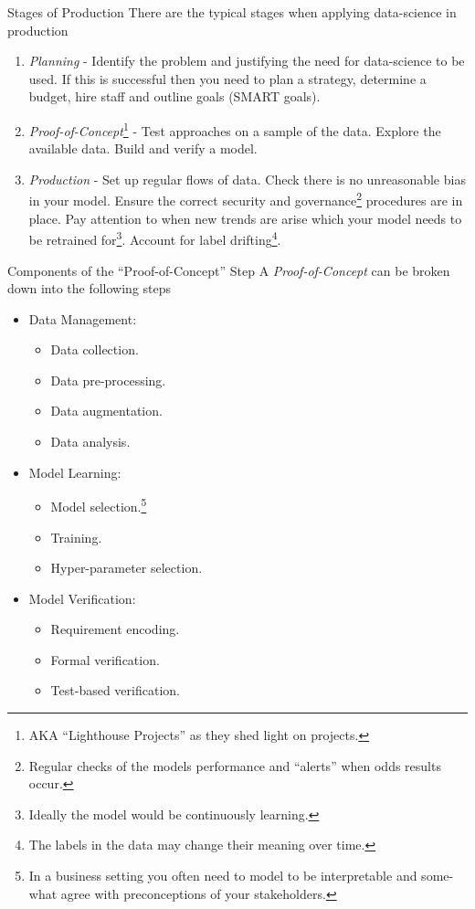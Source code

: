 \documentclass[11pt,a4paper]{article}
\begin{document}
  \begin{remark}{Stages of Production}
    There are the typical stages when applying data-science in production
    \begin{enumerate}
      \item \textit{Planning} - Identify the problem and justifying the need for data-science to be used. If this is successful then you need to plan a strategy, determine a budget, hire staff and outline goals (SMART goals).
      \item \textit{Proof-of-Concept}\footnote{AKA ``Lighthouse Projects'' as they shed light on projects.} - Test approaches on a sample of the data. Explore the available data. Build and verify a model.
      \item \textit{Production} - Set up regular flows of data. Check there is no unreasonable bias in your model. Ensure the correct security and governance\footnote{Regular checks of the models performance and ``alerts'' when odds results occur.} procedures are in place. Pay attention to when new trends are arise which your model needs to be retrained for\footnote{Ideally the model would be continuously learning.}. Account for label drifting\footnote{The labels in the data may change their meaning over time.}.
    \end{enumerate}
  \end{remark}

  \begin{proposition}{Components of the ``Proof-of-Concept'' Step}
    A \textit{Proof-of-Concept} can be broken down into the following steps
    \begin{itemize}
      \item Data Management:
      \begin{itemize}
        \item Data collection.
        \item Data pre-processing.
        \item Data augmentation.
        \item Data analysis.
      \end{itemize}
      \item Model Learning:
      \begin{itemize}
        \item Model selection.\footnote{In a business setting you often need to model to be interpretable and some-what agree with preconceptions of your stakeholders.}
        \item Training.
        \item Hyper-parameter selection.
      \end{itemize}
      \item Model Verification:
      \begin{itemize}
        \item Requirement encoding.
        \item Formal verification.
        \item Test-based verification.
      \end{itemize}
    \end{itemize}
  \end{proposition}
\end{document}
